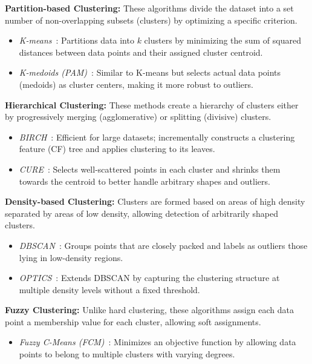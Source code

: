 \textbf{Partition-based Clustering:}
These algorithms divide the dataset into a set number of non-overlapping
subsets (clusters) by optimizing a specific criterion.
\begin{itemize}
    \item \emph{K-means}~\cite{k_means}: Partitions data into $k$ clusters by minimizing
          the sum of squared distances between data points and their assigned
          cluster centroid.
    \item \emph{K-medoids (PAM)}~\cite{k_medoids}: Similar to K-means but selects actual
          data points (medoids) as cluster centers, making it more robust to
          outliers.
\end{itemize}

\textbf{Hierarchical Clustering:}
These methods create a hierarchy of clusters either by progressively
merging (agglomerative) or splitting (divisive) clusters.
\begin{itemize}
    \item \emph{BIRCH}~\cite{birch}: Efficient for large datasets; incrementally
          constructs a clustering feature (CF) tree and applies clustering
          to its leaves.
    \item \emph{CURE}~\cite{cure}:  Selects well-scattered points in each cluster
          and shrinks them towards the centroid to better handle arbitrary
          shapes and outliers.
\end{itemize}

\textbf{Density-based Clustering:}
Clusters are formed based on areas of high density separated by areas
of low density, allowing detection of arbitrarily shaped clusters.
\begin{itemize}
    \item \emph{DBSCAN}~\cite{dbscan}: Groups points that are closely packed and labels
          as outliers those lying in low-density regions.
    \item \emph{OPTICS}~\cite{optics}: Extends DBSCAN by capturing the clustering structure
          at multiple density levels without a fixed threshold.
\end{itemize}

\textbf{Fuzzy Clustering:}
Unlike hard clustering, these algorithms assign each data point a membership
value for each cluster, allowing soft assignments.
\begin{itemize}
    \item \emph{Fuzzy C-Means (FCM)}~\cite{fuzzy_c_means}: Minimizes an objective function by
          allowing data points to belong to multiple clusters with varying degrees.
\end{itemize}


